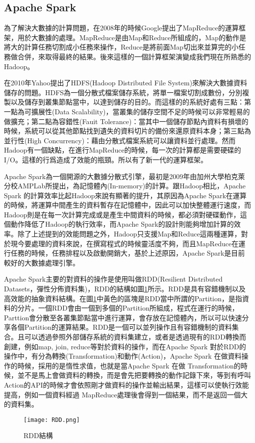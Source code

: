 \subsection{Apache Spark}
為了解決大數據的計算問題，在2008年的時候Google提出了MapReduce\cite{mapreduce}的運算框架，用於大數據的處理。MapReduce是由Map和Reduce所組成的，Map的動作是將大的計算任務切割成小任務來操作，Reduce是將前面Map切出來並算完的小任務做合併，來取得最終的結果。後來這樣的一個計算框架演變成我們現在所熟悉的Hadoop\cite{hadoopwebsite}。\\\par
在2010年Yahoo提出了HDFS(Hadoop Distributed File System)\cite{hdfs}來解決大數據資料儲存的問題。HDFS為一個分散式檔案儲存系統，將單一檔案切割成數份，分別複製以及儲存到叢集節點當中，以達到儲存的目的。而這樣的的系統好處有三點：第一點為可擴展性(Data Scalability)，當叢集的儲存空間不足的時候可以非常輕易的做擴充；第二點為容錯性(Fauit Tolerance)：當其中一個儲存節點內資料有損壞的時候，系統可以從其他節點找到遺失的資料切片的備份來還原資料本身；第三點為並行性(High Concurrency)：藉由分散式檔案系統可以讓資料並行處理。然而Hadoop有一個缺點，在進行MapReduce的時候，每一次的計算都是需要硬碟的I/O。這樣的行爲造成了效能的瓶頸。所以有了新一代的運算框架。\\\par
Apache Spark\cite{sparkwebsite}為一個開源的大數據分散式引擎，最初是2009年由加州大學柏克萊分校AMPLab所提出，為記憶體內(In-memory)的計算。跟Hadoop相比，Apache Spark 的計算效率比起Hadoop來說有顯著的提升，其原因為Apache Spark在運算的時候，將運算中間產生的資料暫存在記憶體中，因此可以加快整體運行速度，而Hadoop則是在每一次計算完成或是產生中間資料的時候，都必須對硬碟動作，這個動作降低了Hadoop的執行效率，而Apache Spark的設計則能夠增加計算的效率。除了上述提到的效能問題之外，Hadoop只支援Map和Reduce這兩種運算，對於現今要處理的資料來說，在撰寫程式的時候靈活度不夠，而且MapReduce在運行任務的時候，任務排程以及啟動開銷大，基於上述原因，Apache Spark是目前較好的大數據處理引擎。\\\par

Apache Spark主要的對資料的操作是使用叫做RDD(Resilient Distributed Datasets，彈性分佈資料集)\cite{zaharia2012resilient}，RDD的結構如圖\ref{rdd}所示。RDD是具有容錯機制以及高效能的抽象資料結構。在圖\ref{rdd}中黃色的區塊是RDD當中所謂的Partition，是指資料的分片。一個RDD會由一個到多個的Partition所組成，程式在運行的時候，Parttion會分散至各叢集節點當中進行運算，會存放在記憶體內，所以可以快速分享各個Partition的運算結果。RDD是一個可以並列操作且有容錯機制的資料集合。且可以透過參照外部儲存系統的資料集建立，或者是透過現有的RDD轉換而創建，例如map, join, reduce等對於資料的操作，而在Apache Spark 對於RDD的操作中，有分為轉換(Transformation)和動作(Action)，Apache Spark 在做資料操作的時候，採用的是惰性求值，也就是當Apache Spark 在做 Transformation的時候，並不是馬上會做資料的轉換，而是會先把要轉換的動作記錄下來，等到有呼叫Action的API的時候才會依照剛才做資料的操作並輸出結果，這樣可以使執行效能提高，例如一個資料經過 MapReduce處理後會得到一個結果，而不是返回一個大的資料集。
\begin{figure}[H]
\centering
\graphicspath{{/Users/FUDA/Documents/masterThesis/image/}}
\texttt{[image: RDD.png]}
\caption{RDD結構}
\label{rdd}
\end{figure}

